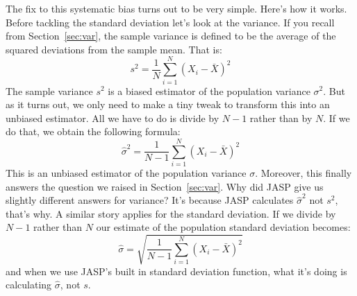 \vspace{0.5cm}
\begin{mdframed}[style=MyFrame,nobreak=true]
The fix to this systematic bias turns out to be very simple. Here's how it works. Before tackling the standard deviation let's look at the variance. If you recall from Section~\ref{sec:var}, the sample variance is defined to be the average of the squared deviations from the sample mean. That is:
$$
s^2 = \frac{1}{N} \sum_{i=1}^N (X_i - \bar{X})^2
$$
The sample variance $s^2$ is a biased estimator of the population variance $\sigma^2$. But as it turns out, we only need to make a tiny tweak to transform this into an unbiased estimator. All we have to do is divide by $N-1$ rather than by $N$. If we do that, we obtain the following formula:
$$
\hat\sigma^2 = \frac{1}{N-1} \sum_{i=1}^N (X_i - \bar{X})^2 
$$
This is an unbiased estimator of the population variance $\sigma$. Moreover, this finally answers the question we raised in Section~\ref{sec:var}. Why did JASP give us slightly different answers for variance? It's because JASP calculates $\hat\sigma^2$ not $s^2$, that's why. A similar story applies for the standard deviation. If we divide by $N-1$ rather than $N$ our estimate of the population standard deviation becomes:
$$
\hat\sigma = \sqrt{\frac{1}{N-1} \sum_{i=1}^N (X_i - \bar{X})^2} 
$$
and when we use JASP's built in standard deviation function, what it's doing is calculating $\hat\sigma$, not $s$. 
\end{mdframed}

